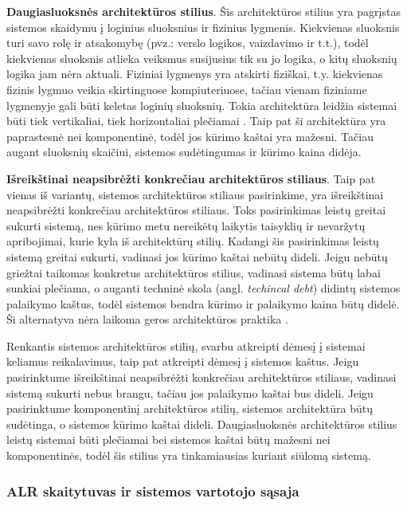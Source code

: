 \textbf{Daugiasluoksnės architektūros stilius}. Šis architektūros stilius yra pagrįstas sistemos skaidymu į loginius sluoksnius ir fizinius lygmenis. Kiekvienas sluoksnis turi savo rolę ir atsakomybę (pvz.: verslo logikos, vaizdavimo ir t.t.), todėl kiekvienas sluoksnis atlieka veiksmus susijusius tik su jo logika, o kitų sluoksnių logika jam nėra aktuali. Fiziniai lygmenys yra atskirti fiziškai, t.y. kiekvienas fizinis lygmuo veikia skirtinguose kompiuteriuose, tačiau vienam fiziniame lygmenyje gali būti keletas loginių sluoksnių. Tokia architektūra leidžia sistemai būti tiek vertikaliai, tiek horizontaliai plečiamai \cite{By}. Taip pat ši architektūra yra paprastesnė nei komponentinė, todėl jos kūrimo kaštai yra mažesni. Tačiau augant sluoksnių skaičiui, sistemos sudėtingumas ir kūrimo kaina didėja.

\textbf{Išreikštinai neapsibrėžti konkrečiau architektūros stiliaus}. Taip pat vienas iš variantų, sistemos architektūros stiliaus pasirinkime, yra išreikštinai neapsibrėžti konkrečiau architektūros stiliaus. Toks pasirinkimas leistų greitai sukurti sistemą, nes kūrimo metu nereikėtų laikytis taisyklių ir nevaržytų apribojimai, kurie kyla iš architektūrų stilių. Kadangi šis pasirinkimas leistų sistemą greitai sukurti, vadinasi jos kūrimo kaštai nebūtų dideli. Jeigu nebūtų griežtai taikomas konkretus architektūros stilius, vadinasi sistema būtų labai sunkiai plečiama, o auganti techninė skola (angl. \textit{techincal debt}) didintų sistemos palaikymo kaštus, todėl sistemos bendra kūrimo ir palaikymo kaina būtų didelė. Ši alternatyva nėra laikoma geros architektūros praktika \cite{Bass2013}.

Renkantis sistemos architektūros stilių, svarbu atkreipti dėmesį į sistemai keliamus reikalavimus, taip pat atkreipti dėmesį į sistemos kaštus. Jeigu pasirinktume išreikštinai neapsibrėžti konkrečiau architektūros stiliaus, vadinasi sistemą sukurti nebus brangu, tačiau jos palaikymo kaštai bus dideli. Jeigu pasirinktume komponentinį architektūros stilių, sistemos architektūra būtų sudėtinga, o sistemos kūrimo kaštai dideli. Daugiasluoksnės architektūros stilius leistų sistemai būti plečiamai bei sistemos kaštai būtų mažesni nei komponentinės, todėl šis stilius yra tinkamiausias kuriant siūlomą sistemą.


\subsubsection{ALR skaitytuvas ir sistemos vartotojo sąsaja}

